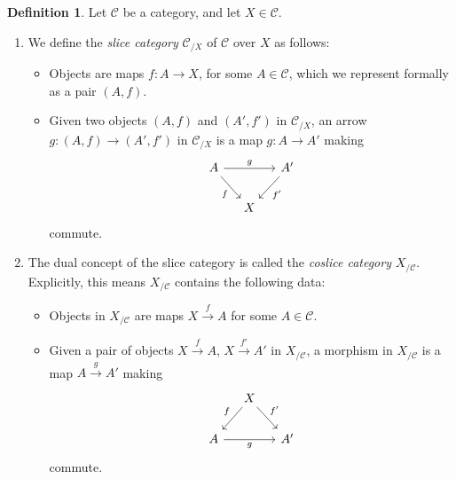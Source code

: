 \documentclass[10pt,oneside]{book}
\def\~#1{\mathscr{#1}}
\def\To#1{\xrightarrow{#1}}
\theoremstyle{plain}
\theoremstyle{definition}
\newtheorem{defn}[thm]{Definition}
\theoremstyle{remark}
\numberwithin{equation}{section}
\numberwithin{figure}{section}
\begin{document}
\begin{defn}
Let $\~C$ be a category, and let $X \in \~C$. 

\begin{enumerate}[label=(\roman*)]
    \item We define the \emph{slice category} $\~C_{/X}$ of $\~C$ over $X$ as follows:
\begin{itemize}
    \item Objects are maps $f: A \to X$, for some $A \in \~C$, which we represent formally as a pair $(A, f)$.
    \item Given two objects $(A, f)$ and $(A', f')$ in $\~C_{/X}$, an arrow $g: (A, f) \to (A', f')$ in $\~C_{/X}$ is a map $g: A \to A'$ making
        \[\begin{tikzcd}[column sep=small] 
            A \arrow[dr, "f", swap] \arrow[rr, "g"]
            & & A' \arrow[dl, "f'"] \\
            & X
        \end{tikzcd}\]
        commute.
\end{itemize}

    \item The dual concept of the slice category is called the \emph{coslice category} $X_{/\~C}$. Explicitly, this means $X_{/\~C}$ contains the following data:
\begin{itemize}
    \item Objects in $X_{/\~C}$ are maps $X \To{f} A$ for some $A \in \~C$.
    \item Given a pair of objects $X \To{f} A$, $X \To{f'} A'$ in $X_{/\~C}$, a morphism in $X_{/\~C}$ is a map $A \To{g} A'$ making
    \[\begin{tikzcd}[column sep=small]
        & X \arrow[dl, "f", swap] \arrow[dr, "f'"] & \\
        A \arrow[rr, "g", swap] & & A'
    \end{tikzcd}\]
        commute.
\end{itemize}
\end{enumerate}
\end{defn}
\end{document}
